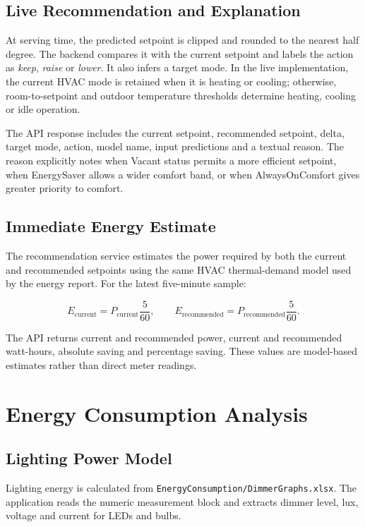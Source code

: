 \section{Live Recommendation and Explanation}

At serving time, the predicted setpoint is clipped and rounded to the nearest
half degree. The backend compares it with the current setpoint and labels the
action as \textit{keep}, \textit{raise} or \textit{lower}. It also infers a
target mode. In the live implementation, the current HVAC mode is retained
when it is heating or cooling; otherwise, room-to-setpoint and outdoor
temperature thresholds determine heating, cooling or idle operation.

The API response includes the current setpoint, recommended setpoint, delta,
target mode, action, model name, input predictions and a textual reason. The
reason explicitly notes when Vacant status permits a more efficient setpoint,
when EnergySaver allows a wider comfort band, or when AlwaysOnComfort gives
greater priority to comfort.

\section{Immediate Energy Estimate}

The recommendation service estimates the power required by both the current
and recommended setpoints using the same HVAC thermal-demand model used by the
energy report. For the latest five-minute sample:

\[
    E_{\mathrm{current}} =
    P_{\mathrm{current}}\frac{5}{60},
    \qquad
    E_{\mathrm{recommended}} =
    P_{\mathrm{recommended}}\frac{5}{60}.
\]

The API returns current and recommended power, current and recommended
watt-hours, absolute saving and percentage saving. These values are model-based
estimates rather than direct meter readings.


\chapter{Energy Consumption Analysis}
\label{chap:energy-analysis}

\section{Lighting Power Model}

Lighting energy is calculated from
\texttt{EnergyConsumption/DimmerGraphs.xlsx}. The application reads the
numeric measurement block and extracts dimmer level, lux, voltage and current
for LEDs and bulbs.

